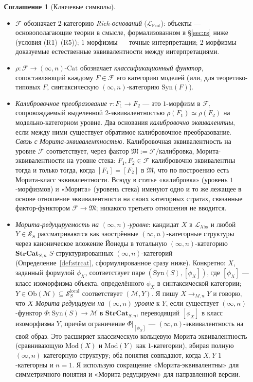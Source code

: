 \documentclass[11pt]{article}
\theoremstyle{plain}
\theoremstyle{definition}
\newtheorem{convention}[theorem]{Соглашение}
\newcommand{\cS}{\mathcal{S}}
\newcommand{\cF}{\mathcal{F}}
\newcommand{\cM}{\mathcal{M}}
\newcommand{\fM}{\mathfrak{M}}
\newcommand{\LFnd}{\mathcal{L}_{\mathrm{Fnd}}}
\newcommand{\LAbs}{\mathcal{L}_{\mathrm{Abs}}}
\newcommand{\Ob}{\mathrm{Ob}}
\newcommand{\Cat}{\mathrm{Cat}}
\newcommand{\Syn}{\mathrm{Syn}}
\newcommand{\Mod}{\mathrm{Mod}}
\begin{document}
\begin{convention}[Ключевые символы]\label{conv:notation}
\begin{itemize}
\item $\cF$ обозначает $2$-категорию \emph{Rich-оснований} ($\LFnd$): объекты — основополагающие теории в смысле, формализованном в \S\ref{sec:rs} ниже (условия (R1)--(R5)); $1$-морфизмы — точные интерпретации; $2$-морфизмы — доказуемые естественные эквивалентности между интерпретациями.
\item $\rho : \cF \to (\infty, n)\text{-}\Cat$ обозначает \emph{классификационный функтор}, сопоставляющий каждому $F \in \cF$ его категорию моделей (или, для теоретико-типовых $F$, синтаксическую $(\infty, n)$-категорию $\Syn(F)$).
\item \emph{Калибровочное преобразование} $\tau : F_1 \to F_2$ — это $1$-морфизм в $\cF$, сопровождаемый выделенной $2$-эквивалентностью $\rho(F_1) \simeq \rho(F_2)$ на модельно-категорном уровне. Два основания \emph{калибровочно эквивалентны}, если между ними существует обратимое калибровочное преобразование. \emph{Связь с Морита-эквивалентностью.} Калибровочная эквивалентность на уровне $\cF$ соответствует, через фактор $\fM := \cF/\text{калибровка}$, Морита-эквивалентности на уровне стека: $F_1, F_2 \in \cF$ калибровочно эквивалентны тогда и только тогда, когда $[F_1] = [F_2]$ в $\fM$, что по построению есть Морита-класс эквивалентности. Всюду в статье «калибровка» (уровень $1$-морфизмов) и «Морита» (уровень стека) именуют одно и то же лежащее в основе отношение эквивалентности на своих категорных стратах, связанные фактор-функтором $\cF \to \fM$; никакого третьего отношения не вводится.
\item \emph{Морита-редуцируемость на $(\infty, n)$-уровне}: кандидат $X$ в $\LAbs$ и любой $Y \in \cS_S$ рассматриваются как заострённые $(\infty, n)$-категорные структуры через каноническое вложение Йонеды в тотальную $(\infty, n)$-категорию $\mathbf{StrCat}_{S, n}$ $S$-структурированных $(\infty, n)$-категорий (Определение~\ref{def:strcat}, сформулированное сразу ниже). Конкретно: $X$, заданный формулой $\phi_X$, соответствует паре $(\Syn(S), [\phi_X])$, где $[\phi_X]$ — класс изоморфизма объекта, определённого $\phi_X$ в синтаксической категории; $Y \in \Ob(\cM) \subseteq \cS_S^{\mathrm{local}}$ соответствует $(\cM, Y)$. Я пишу $X \to_{M, n} Y$ и говорю, что $X$ \emph{Морита-редуцируем на $(\infty, n)$-уровне} к $Y$, если существует $(\infty, n)$-функтор $\Phi : \Syn(S) \to \cM$ в $\mathbf{StrCat}_{S, n}$, переводящий $[\phi_X]$ в класс изоморфизма $Y$, причём ограничение $\Phi |_{[\phi_X]}$ — $(\infty, n)$-эквивалентность на свой образ. Это расширяет классическую кольцевую Морита-эквивалентность (сравнивающую $\Mod(X)$ и $\Mod(Y)$ как $1$-категории), вбирая полную $(\infty, n)$-категорную структуру; оба понятия совпадают, когда $X, Y$ $1$-категорны и $n = 1$. Я использую сокращение «Морита-эквивалентны» для симметричного понятия и «Морита-редуцируем» для направленной версии.

\end{itemize}
\end{convention}
\end{document}
